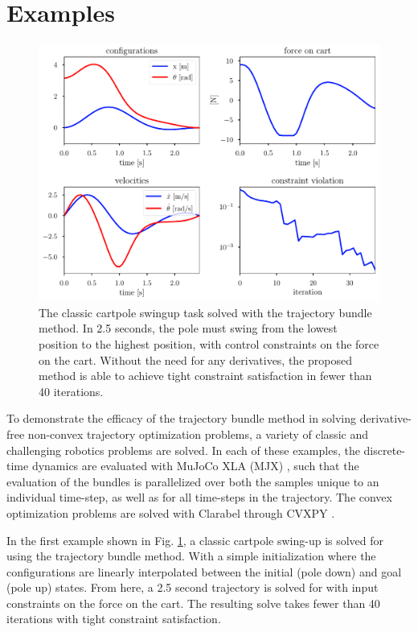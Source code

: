 %
%
%
\section{Examples}
%
%
%
\begin{figure}
    \centering
    \includegraphics[width=0.9\linewidth]{bundles/examples/cartpole_fig.pdf}
    \caption{The classic cartpole swingup task solved with the trajectory bundle method. In 2.5 seconds, the pole must swing from the lowest position to the highest position, with control constraints on the force on the cart. Without the need for any derivatives, the proposed method is able to achieve tight constraint satisfaction in fewer than 40 iterations.}
    \label{fig:btb:cartpole}
\end{figure}

To demonstrate the efficacy of the trajectory bundle method in solving derivative-free non-convex trajectory optimization problems, a variety of classic and challenging robotics problems are solved. In each of these examples, the discrete-time dynamics are evaluated with MuJoCo XLA (MJX) \cite{todorov2012}, such that the evaluation of the bundles is parallelized over both the samples unique to an individual time-step, as well as for all time-steps in the trajectory. The convex optimization problems are solved with Clarabel \cite{goulart2024} through CVXPY \cite{diamond}.

In the first example shown in Fig. \ref{fig:btb:cartpole}, a classic cartpole swing-up is solved for using the trajectory bundle method. With a simple initialization where the configurations are linearly interpolated between the initial (pole down) and goal (pole up) states. From here, a 2.5 second trajectory is solved for with input constraints on the force on the cart. The resulting solve takes fewer than 40 iterations with tight constraint satisfaction. 

